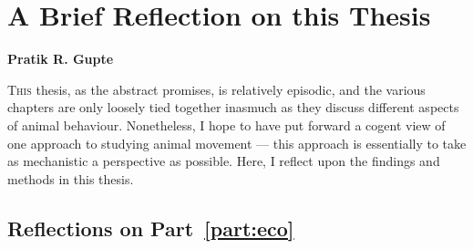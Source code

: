 
%
\chapter{A Brief Reflection on this Thesis}\label{ch:discussion}

{\noindent \textbf{Pratik R. Gupte}}

\lettrine{T}{his} thesis, as the abstract promises, is relatively episodic, and the various chapters are only loosely tied together inasmuch as they discuss different aspects of animal behaviour.
Nonetheless, I hope to have put forward a cogent view of one approach to studying animal movement --- this approach is essentially to take as mechanistic a perspective as possible.
Here, I reflect upon the findings and methods in this thesis.

\section*{Reflections on Part~\ref{part:eco}}

